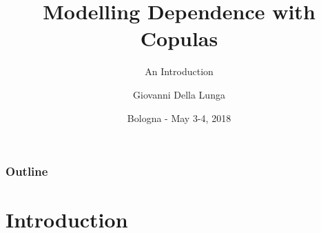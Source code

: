 \documentclass[11pt]{beamer}
\author{Giovanni Della Lunga}
\title{Modelling Dependence with Copulas}
\subtitle{An Introduction} %
\institute{WORKSHOP IN QUANTITATIVE FINANCE}
\date{Bologna - May 3-4, 2018} %
\theoremstyle{plain}
\theoremstyle{definition}
\theoremstyle{remark}
\begin{document}
\begin{frame}
\titlepage
\end{frame}

\makeatletter
\patchcmd{\beamer@sectionintoc}
  {\vfill}
  {\itemsep}
  {}
  {}
\makeatother 

\begin{frame}
\frametitle{Outline}
  \begin{multicols}{2}
  \tableofcontents
  \end{multicols}
\end{frame}

\section{Introduction}
\end{document}

